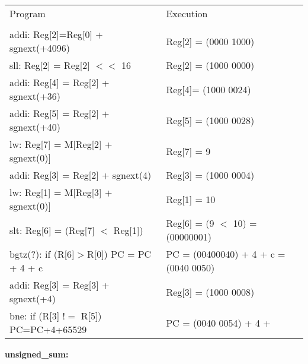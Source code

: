 \documentclass[11pt]{article}   	%
\begin{document}
\begin{table}[!htbp]
\begin{tabular}{ll}
Program & Execution\\
&\\
addi: Reg[2]=Reg[0] + sgnext(+4096) & Reg[2] = (0000 1000)\\

sll: Reg[2] = Reg[2] $<<$ 16 & Reg[2] = (1000 0000)\\

addi: Reg[4] = Reg[2] + sgnext(+36) & Reg[4]= (1000 0024)\\

addi: Reg[5] = Reg[2] + sgnext(+40) & Reg[5] = (1000 0028)\\

lw: Reg[7] = M[Reg[2] + sgnext(0)] & Reg[7] = 9 \\

addi: Reg[3] = Reg[2] + sgnext(4) & Reg[3] = (1000 0004)\\

lw: Reg[1] = M[Reg[3] + sgnext(0)] & Reg[1] = 10 \\

slt: Reg[6] = (Reg[7] $<$ Reg[1]) & Reg[6] = (9 $<$ 10) = (00000001)\\

bgtz(?): if (R[6]$>$R[0]) PC = PC + 4 + c & PC = (00400040) + 4 + c = (0040 0050)\\

addi: Reg[3] = Reg[3] + sgnext(+4) & Reg[3] = (1000 0008)\\

bne: if (R[3] $!=$ R[5]) PC=PC+4+65529 & PC = (0040 0054) + 4 + 





\end{tabular}
\end{table}



\newpage



\textbf{unsigned\_sum:}\\
\end{document}
